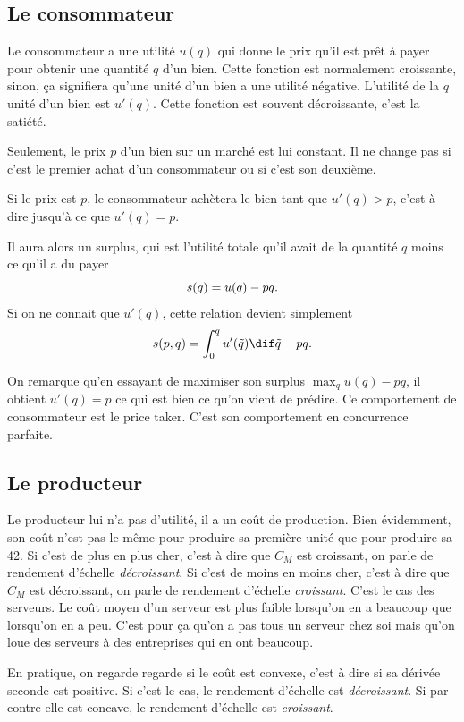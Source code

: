 \subsection{Le consommateur}
Le consommateur a une utilité $u(q)$ qui donne le prix qu'il est prêt à payer
pour obtenir une quantité $q$ d'un bien.
Cette fonction est normalement croissante, sinon, ça signifiera qu'une unité
d'un bien a une utilité négative.
L'utilité de la $q$\ieme{} unité d'un bien est $u'(q)$.
Cette fonction est souvent décroissante, c'est la satiété.

Seulement, le prix $p$ d'un bien sur un marché est lui constant.
Il ne change pas si c'est le premier achat d'un consommateur ou si
c'est son deuxième.

Si le prix est $p$, le consommateur achètera le bien tant que
$u'(q) > p$, c'est à dire jusqu'à ce que $u'(q) = p$.

Il aura alors un surplus, qui est l'utilité totale qu'il avait
de la quantité $q$ moins ce qu'il a du payer
\[ s(q) = u(q) - pq. \]
Si on ne connait que $u'(q)$, cette relation devient simplement
\begin{equation}
  \label{eq:surplus_1cons}
  \surplus(p, q) = \int_0^q u'(\tilde{q})\dif \tilde{q} - pq.
\end{equation}

On remarque qu'en essayant de maximiser son surplus $\max_q u(q) - pq$,
il obtient $u'(q) = p$ ce qui est bien ce qu'on vient de prédire.
Ce comportement de consommateur est le price taker.
C'est son comportement en concurrence parfaite.

\subsection{Le producteur}
Le producteur lui n'a pas d'utilité, il a un coût de production.
Bien évidemment, son coût n'est pas le même pour produire sa première unité
que pour produire sa 42\ieme{}.
Si c'est de plus en plus cher,
c'est à dire que $C_M$ est croissant,
on parle de rendement d'échelle \emph{décroissant}.
Si c'est de moins en moins cher,
c'est à dire que $C_M$ est décroissant,
on parle de rendement d'échelle \emph{croissant}.
C'est le cas des serveurs.
Le coût moyen d'un serveur est plus faible lorsqu'on en a beaucoup que
lorsqu'on en a peu.
C'est pour ça qu'on a pas tous un serveur chez soi mais qu'on loue
des serveurs à des entreprises qui en ont beaucoup.

En pratique, on regarde regarde si le coût est convexe,
c'est à dire si sa dérivée seconde est positive.
Si c'est le cas, le rendement d'échelle est \emph{décroissant}.
Si par contre elle est concave, le rendement d'échelle est \emph{croissant}.

